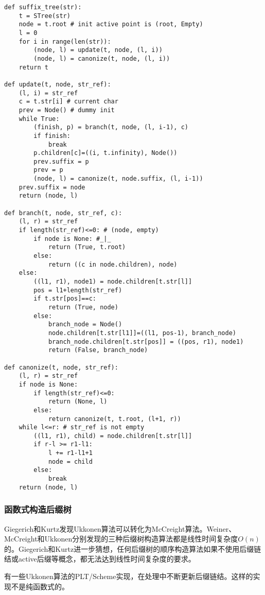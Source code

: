 \documentclass[UTF8]{article}
\begin{document}
\begin{lstlisting}
def suffix_tree(str):
    t = STree(str)
    node = t.root # init active point is (root, Empty)
    l = 0
    for i in range(len(str)):
        (node, l) = update(t, node, (l, i))
        (node, l) = canonize(t, node, (l, i))
    return t

def update(t, node, str_ref):
    (l, i) = str_ref
    c = t.str[i] # current char
    prev = Node() # dummy init
    while True:
        (finish, p) = branch(t, node, (l, i-1), c)
        if finish:
            break
        p.children[c]=((i, t.infinity), Node())
        prev.suffix = p
        prev = p
        (node, l) = canonize(t, node.suffix, (l, i-1))
    prev.suffix = node
    return (node, l)

def branch(t, node, str_ref, c):
    (l, r) = str_ref
    if length(str_ref)<=0: # (node, empty)
        if node is None: #_|_
            return (True, t.root)
        else:
            return ((c in node.children), node)
    else:
        ((l1, r1), node1) = node.children[t.str[l]]
        pos = l1+length(str_ref)
        if t.str[pos]==c:
            return (True, node)
        else:
            branch_node = Node()
            node.children[t.str[l1]]=((l1, pos-1), branch_node)
            branch_node.children[t.str[pos]] = ((pos, r1), node1)
            return (False, branch_node)

def canonize(t, node, str_ref):
    (l, r) = str_ref
    if node is None:
        if length(str_ref)<=0:
            return (None, l)
        else:
            return canonize(t, t.root, (l+1, r))
    while l<=r: # str_ref is not empty
        ((l1, r1), child) = node.children[t.str[l]]
        if r-l >= r1-l1:
            l += r1-l1+1
            node = child
        else:
            break
    return (node, l)
\end{lstlisting}

\subsubsection{函数式构造后缀树}

Giegerich和Kurtz发现Ukkonen算法可以转化为McCreight算法\cite{GieKur97}。Weiner、McCreight和Ukkonen分别发现的三种后缀树构造算法都是线性时间复杂度$O(n)$的。Giegerich和Kurtz进一步猜想，任何后缀树的顺序构造算法如果不使用后缀链结或active后缀等概念，都无法达到线性时间复杂度的要求。

有一些Ukkonen算法的PLT/Scheme实现\cite{plt-stree}，在处理中不断更新后缀链结。这样的实现不是纯函数式的。
\end{document}
